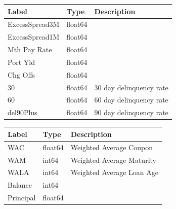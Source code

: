 \documentclass{article}
\begin{document}
\begin{table}[h]
  \small\centering
  \begin{floatrow}
   {\begin{tabular}{lll}
\toprule
Label &               Type  & Description \\
\midrule
ExcessSpread3M &  float64 \\
ExcessSpread1M &  float64 \\
Mth Pay Rate   &  float64 \\
Port Yld       &  float64 \\
Chg Offs       &  float64 \\
30             &  float64 & 30 day delinquency rate \\
60             &  float64 & 60 day delinquency rate\\
del90Plus      &  float64 & 90 day delinquency rate\\
\bottomrule
\end{tabular}}
  \end{floatrow}
\end{table}

\begin{table}[h]
  \small\centering
  \begin{floatrow}
   {\begin{tabular}{lll}
\toprule
Label &               Type  & Description \\
\midrule
WAC       &  float64 & Weighted Average Coupon \\
WAM       &    int64 & Weighted Average Maturity \\
WALA      &    int64 & Weighted Average Loan Age \\
Balance   &    int64 & \\
Principal &  float64 & \\
\bottomrule
\end{tabular}}
  \end{floatrow}
\end{table}
\end{document}
